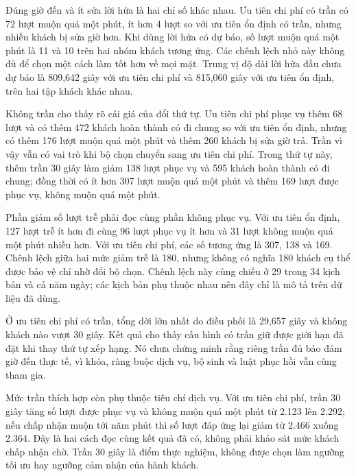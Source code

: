Đúng giờ đến và ít sửa lời hứa là hai chỉ số khác nhau. Ưu tiên chi phí có trần có 72 lượt muộn quá một phút,
ít hơn 4 lượt so với ưu tiên ổn định có trần, nhưng nhiều khách bị sửa giờ hơn. Khi dùng lời hứa có dự báo, số
lượt muộn quá một phút là 11 và 10 trên hai nhóm khách tương ứng. Các chênh lệch nhỏ này không đủ để chọn một
cách làm tốt hơn về mọi mặt. Trung vị độ dài lời hứa đầu chưa dự báo là 809,642 giây với ưu tiên chi phí và
815,060 giây với ưu tiên ổn định, trên hai tập khách khác nhau.

Không trần cho thấy rõ cái giá của đổi thứ tự. Ưu tiên chi phí phục vụ thêm 68 lượt và có thêm 472 khách hoàn
thành có đi chung so với ưu tiên ổn định, nhưng có thêm 176 lượt muộn quá một phút và thêm 260 khách bị sửa giờ
trả. Trần vì vậy vẫn có vai trò khi bộ chọn chuyển sang ưu tiên chi phí. Trong thứ tự này, thêm trần 30 giây làm
giảm 138 lượt phục vụ và 595 khách hoàn thành có đi chung; đồng thời có ít hơn 307 lượt muộn quá một phút và
thêm 169 lượt được phục vụ, không muộn quá một phút.

Phần giảm số lượt trễ phải đọc cùng phần không phục vụ. Với ưu tiên ổn định, 127 lượt trễ ít hơn đi cùng 96 lượt
phục vụ ít hơn và 31 lượt không muộn quá một phút nhiều hơn. Với ưu tiên chi phí, các số tương ứng là 307, 138
và 169. Chênh lệch giữa hai mức giảm trễ là 180, nhưng không có nghĩa 180 khách cụ thể được bảo vệ chỉ nhờ đổi
bộ chọn. Chênh lệch này cùng chiều ở 29 trong 34 kịch bản và cả năm ngày; các kịch bản phụ thuộc nhau nên đây
chỉ là mô tả trên dữ liệu đã dùng.

Ở ưu tiên chi phí có trần, tổng dời lớn nhất do điều phối là 29,657 giây và không khách nào vượt 30 giây.
Kết quả cho thấy cấu hình có trần giữ được giới hạn đã đặt khi thay thứ tự xếp hạng. Nó chưa chứng minh rằng
riêng trần đủ bảo đảm giờ đến thực tế, vì khóa, ràng buộc dịch vụ, bộ sinh và luật phục hồi vẫn cùng tham gia.

Mức trần thích hợp còn phụ thuộc tiêu chí dịch vụ. Với ưu tiên chi phí, trần 30 giây tăng số lượt được phục vụ
và không muộn quá một phút từ 2.123 lên 2.292; nếu chấp nhận muộn tới năm phút thì số lượt đáp ứng lại giảm
từ 2.466 xuống 2.364. Đây là hai cách đọc cùng kết quả đã có, không phải khảo sát mức khách chấp nhận chờ.
Trần 30 giây là điểm thực nghiệm, không được chọn làm ngưỡng tối ưu hay ngưỡng cảm nhận của hành khách.

